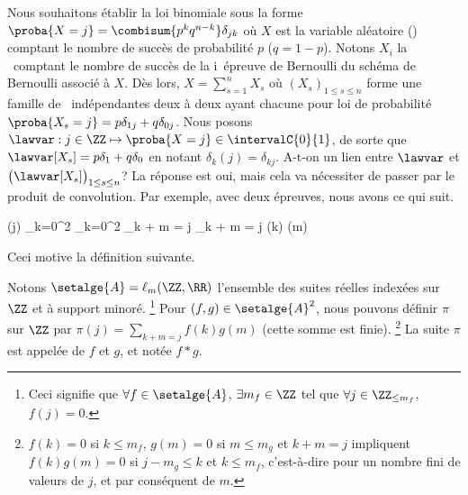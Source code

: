 Nous souhaitons établir la loi binomiale sous la forme
$\proba{X = j} = \combisum{p^k q^{n-k}} \delta_{jk}$
où $X$ est la variable aléatoire (\va) comptant le nombre de succès de probabilité $p$ ($q = 1 - p$).
%
Notons $X_i$ la \va\ comptant le nombre de succès de la i\ieme\ épreuve de Bernoulli du schéma de Bernoulli associé à $X$.
Dès lors,
$X = \sum_{s=1}^{n} X_s$ 
où
$(X_s)_{1 \leq s \leq n}$ forme une famille de \va\ indépendantes deux à deux  ayant chacune pour loi de probabilité $\proba{X_s = j} = p \delta_{1j} + q \delta_{0j}$.
Nous posons
$\lawvar: j \in \ZZ \mapsto \proba{X = j} \in \intervalC{0}{1}$,
de sorte que
$\lawvar[X_s] = p \delta_{1} + q \delta_{0}$
en notant
$\delta_{k}(j) = \delta_{kj}$.
A-t-on un lien entre $\lawvar$ et $\big( \lawvar[X_s] \big)_{1 \leq s \leq n}$? La réponse est oui, mais cela va nécessiter de passer par le produit de convolution.
%
Par exemple, avec deux épreuves, nous avons ce qui suit.


\begin{stepcalc}[style=sar]
	\lawvar(j)
\explnext{}
\explnext{}
	\dsum_{k=0}^{2} 
	\dsum_{k=0}^{2}  
	\dsum_{k + m = j}  
\explnext{}
	\dsum_{k + m = j} \lawvar[X_1](k) \lawvar[X_2](m)
\end{stepcalc}

Ceci motive la définition suivante.




\begin{defi}
	Notons $\setalge{A} = \ell_{\small m}(\ZZ , \RR)$ l'ensemble des suites réelles indexées sur $\ZZ$ et à support minoré.%
	\footnote{
		Ceci signifie que 
		$\forall f \in \setalge{A}$, 
		$\exists m_f \in \ZZ$ 
		tel que
		$\forall j \in \ZZ_{\leq m_f}$, $f(j) = 0$.
	}
	Pour $(f,g) \in \setalge{A}^2$,
	nous pouvons définir $\pi$ sur $\ZZ$ par
	$\pi(j) = \sum_{k + m = j} f(k) g(m)$
	(cette somme est finie).%
	\footnote{
		$f(k) = 0$ si $k \leq m_f$,
		$g(m) = 0$ si $m \leq m_g$
		et
		$k + m = j$
		impliquent
		$f(k) g(m) = 0$
		si
		$j - m_g \leq k$ et $k \leq m_f$,
		c'est-à-dire pour un nombre fini de valeurs de $j$, et par conséquent de $m$.
		
	}
	La suite $\pi$ est appelée  de $f$ et $g$,
	et notée $f \ast g$.
\end{defi}


